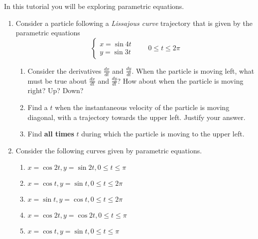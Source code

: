 \begin{objectives}
    In this tutorial you will be exploring parametric equations.
\end{objectives}

\begin{enumerate}
    \item Consider a particle following a \emph{Lissajous curve} trajectory that is given by the parametric equations
    \[
    \begin{cases}
        x=\sin{4t}\\
        y=\sin{3t}
    \end{cases}\qquad 0 \leq t \leq 2\pi
    \]

    \begin{enumerate}
        \item Consider the derivatives $\frac{dx}{dt}$ and $\frac{dy}{dt}$. 
        When the particle is moving left, what must be true about $\frac{dx}{dt}$ and $\frac{dy}{dt}$?
        How about when the particle is moving right? Up? Down?

        \item Find a $t$ when the instantaneous velocity of the particle is moving diagonal, with a trajectory towards the upper left. Justify your answer.

        \item Find \textbf{all times} $t$ during which the particle is moving
        to the upper left.
        
    \end{enumerate}

    \item Consider the following curves given by parametric equations.

    \begin{tcolorbox}[sharp corners=all,colframe=tolGrey,colback=white]
    \begin{multicols}{2}
    \begin{enumerate}[label={(\roman{enumii})},nosep,itemsep=1mm]
        \item $x = \cos{2t}, y = \sin{2t}, 0 \leq t \leq \pi$
        \item $x = \cos{t}, y = \sin{t}, 0 \leq t \leq 2\pi$
        \item $x = \sin{t}, y = \cos{t}, 0 \leq t \leq 2\pi$
        \item $x = \cos{2t}, y = \cos{2t}, 0 \leq t \leq \pi$
        \item $x = \cos{t}, y = \sin{t}, 0 \leq t \leq \pi$
    \end{enumerate}
    \end{multicols}
    \end{tcolorbox}
    

\end{enumerate}
